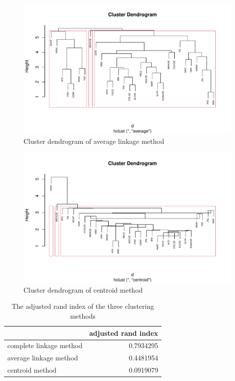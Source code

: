 \documentclass[11pt,a4paper,]{article}
\begin{document}
\begin{figure}
\centering
\includegraphics{ass2_files/figure-latex/average-1.pdf}
\caption{\label{fig:average}Cluster dendrogram of average linkage method}
\end{figure}

\begin{figure}
\centering
\includegraphics{ass2_files/figure-latex/centroid-1.pdf}
\caption{\label{fig:centroid}Cluster dendrogram of centroid method}
\end{figure}

\begin{table}

\caption{\label{tab:adjusted-index}The adjusted rand index of the three clustering methods}
\centering
\begin{tabular}[t]{l|r}
\hline
  & adjusted rand index\\
\hline
complete linkage method & 0.7934295\\
\hline
average linkage method & 0.4481954\\
\hline
centroid method & 0.0919079\\
\hline
\end{tabular}
\end{table}

\printbibliography
\end{document}
